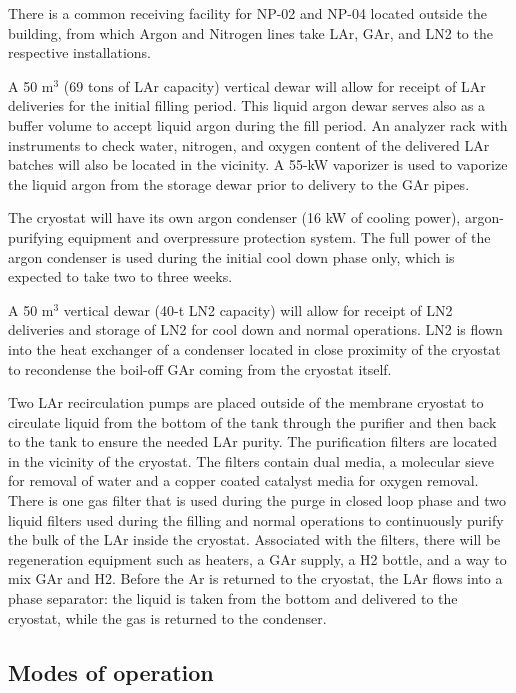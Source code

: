 There is a common receiving facility for NP-02 and NP-04 located outside the building, from which Argon and Nitrogen lines take LAr, GAr, and LN2 to the respective installations.

A 50 m$^3$ (69 tons of LAr capacity) vertical dewar will allow for receipt of LAr deliveries for the initial filling period. This liquid argon dewar serves also as a buffer volume to accept liquid argon during the fill period. An analyzer rack with instruments to check water, nitrogen, and oxygen content of the delivered LAr batches will also be located in the vicinity. A 55-kW vaporizer is used to vaporize the liquid argon from the storage dewar prior to delivery to the GAr pipes.

The cryostat will have its own argon condenser (16 kW of cooling power), argon-purifying equipment and overpressure protection system. The full power of the argon condenser is used during the initial cool down phase only, which is expected to take two to three weeks. 

A 50 m$^3$ vertical dewar (40-t LN2 capacity) will allow for receipt of LN2 deliveries and storage of LN2 for cool down and normal operations. LN2 is flown into the heat exchanger of a condenser located in close proximity of the cryostat to recondense the boil-off GAr coming from the cryostat itself.

Two LAr recirculation pumps are placed outside of the membrane cryostat to circulate liquid from the bottom of the tank through the purifier and then back to the tank to ensure the needed LAr purity. 
%
The purification filters are located in the vicinity of the cryostat. The filters contain dual media, a molecular sieve for removal of water and a copper coated catalyst media for oxygen removal. There is one gas filter that is used during the purge in closed loop phase and two liquid filters used during the filling and normal operations to continuously purify the bulk of the LAr inside the cryostat. Associated with the filters, there will be regeneration equipment such as heaters, a GAr supply, a H2 bottle, and a way to mix GAr and H2. 
%
Before the Ar is returned to the cryostat, the LAr flows into a phase separator: the liquid is taken from the bottom and delivered to the cryostat, while the gas is returned to the condenser.


\subsection{Modes of operation}
\label{sec:cryo-op-modes}

